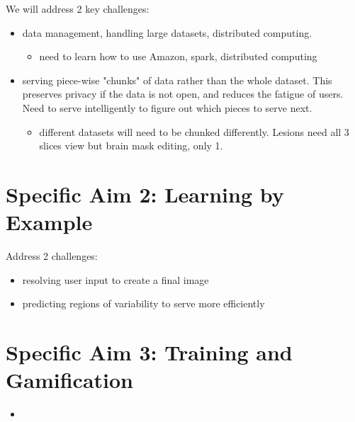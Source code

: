 We will address 2 key challenges:
\begin{itemize}
\item data management, handling large datasets, distributed computing. 
\begin{itemize}
\item need to learn how to use Amazon, spark, distributed computing
\end{itemize}
\item serving piece-wise "chunks" of data rather than the whole dataset. This preserves privacy if the data is not open, and reduces the fatigue of users. Need to serve intelligently to figure out which pieces to serve next.
\begin{itemize}
\item different datasets will need to be chunked differently. Lesions need all 3 slices view but brain mask editing, only 1.
\end{itemize}
\end{itemize}

\section{Specific Aim 2: Learning by Example}

Address 2 challenges:
\begin{itemize}
\item resolving user input to create a final image
\item predicting regions of variability to serve more efficiently
\end{itemize}

\section{Specific Aim 3: Training and Gamification}
\begin{itemize}
\item 
\end{itemize}